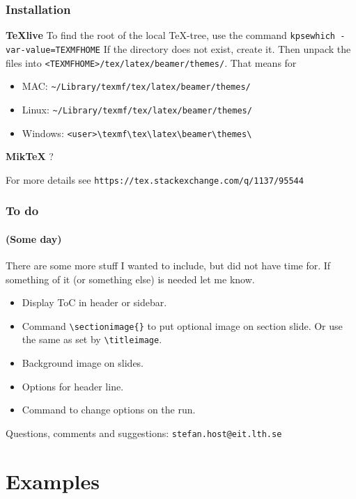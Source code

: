 \documentclass[aspectratio=1610]{beamer}
\begin{document}
\begin{frame}[plain]
  \titlepage
\end{frame}
\titleimage{}

\begin{frame}[fragile]
  \frametitle{Installation}
  \textbf{TeXlive}\newline
  To find the root of the local TeX-tree, use the command\newline
  \verb|kpsewhich -var-value=TEXMFHOME|\newline
  If the directory does not exist, create it. Then unpack the files into \verb|<TEXMFHOME>/tex/latex/beamer/themes/|. That means for 
  \begin{itemize}
  \item MAC: \verb|~/Library/texmf/tex/latex/beamer/themes/|
  \item Linux: \verb|~/Library/texmf/tex/latex/beamer/themes/|
  \item Windows: \verb|<user>\texmf\tex\latex\beamer\themes\|
  \end{itemize}
  \textbf{MikTeX}\newline
  ?
  \par\strut\par
  For more details see \verb|https://tex.stackexchange.com/q/1137/95544|
\end{frame}

\begin{frame}[fragile]
  \frametitle{To do}
  \framesubtitle{(Some day)}
  There are some more stuff I wanted to include, but did not have time for. If something of it (or something else) is needed let me know. 
  \begin{itemize}
  \item Display ToC in header or sidebar.
  \item Command \verb|\sectionimage{}| to put optional image on section slide. Or use the same as set by \verb|\titleimage|.
  \item Background image on slides.
  \item Options for header line.
  \item Command to change options on the run.
  \end{itemize}
  Questions, comments and suggestions: \verb|stefan.host@eit.lth.se|
\end{frame}

\section{Examples}
\end{document}
